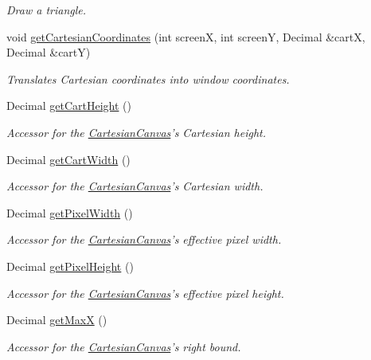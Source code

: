 \begin{DoxyCompactItemize}
\begin{DoxyCompactList}\small\item\em Draw a triangle. \end{DoxyCompactList}\item 
void \hyperlink{class_cartesian_canvas_a022ac6bdb68f70b9d0dca1edc0f6cc05}{get\+Cartesian\+Coordinates} (int screen\+X, int screen\+Y, Decimal \&cart\+X, Decimal \&cart\+Y)
\begin{DoxyCompactList}\small\item\em Translates Cartesian coordinates into window coordinates. \end{DoxyCompactList}\item 
Decimal \hyperlink{class_cartesian_canvas_a00ab6f569e805c9ee662b1dba3f90b90}{get\+Cart\+Height} ()
\begin{DoxyCompactList}\small\item\em Accessor for the \hyperlink{class_cartesian_canvas}{Cartesian\+Canvas}'s Cartesian height. \end{DoxyCompactList}\item 
Decimal \hyperlink{class_cartesian_canvas_a2a89763ee9a724fb1b07b3fc7c7351a2}{get\+Cart\+Width} ()
\begin{DoxyCompactList}\small\item\em Accessor for the \hyperlink{class_cartesian_canvas}{Cartesian\+Canvas}'s Cartesian width. \end{DoxyCompactList}\item 
Decimal \hyperlink{class_cartesian_canvas_a07fffa1ea919da9022e23aaa25a175d8}{get\+Pixel\+Width} ()
\begin{DoxyCompactList}\small\item\em Accessor for the \hyperlink{class_cartesian_canvas}{Cartesian\+Canvas}'s effective pixel width. \end{DoxyCompactList}\item 
Decimal \hyperlink{class_cartesian_canvas_a9acb1906f1423f336654be45ee7b2a82}{get\+Pixel\+Height} ()
\begin{DoxyCompactList}\small\item\em Accessor for the \hyperlink{class_cartesian_canvas}{Cartesian\+Canvas}'s effective pixel height. \end{DoxyCompactList}\item 
Decimal \hyperlink{class_cartesian_canvas_a494303f706ba4170b7e4ff011b9eab5e}{get\+Max\+X} ()
\begin{DoxyCompactList}\small\item\em Accessor for the \hyperlink{class_cartesian_canvas}{Cartesian\+Canvas}'s right bound. \end{DoxyCompactList}\item 

\end{DoxyCompactItemize}
